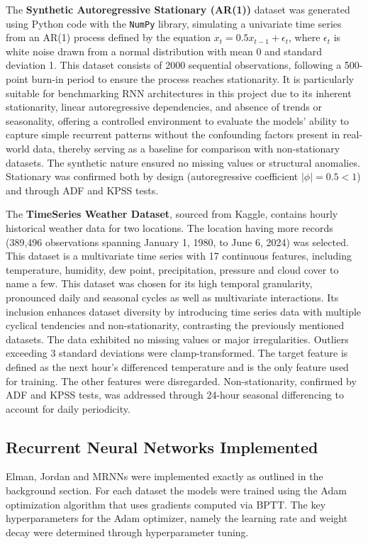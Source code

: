 \documentclass[conference, 10pt]{IEEEtran}
\begin{document}
The \textbf{Synthetic Autoregressive Stationary (AR(1))} dataset was generated using Python code with the \texttt{NumPy}
library, simulating a univariate time series from an AR(1) process defined by the equation $x_t = 0.5 x_{t-1} +
\epsilon_t$, where $\epsilon_t$ is white noise drawn from a normal distribution with mean 0 and standard deviation 1.
This dataset consists of 2000 sequential observations, following a 500-point burn-in period to ensure the process reaches
stationarity. It is particularly suitable for benchmarking RNN architectures in this project due to its inherent
stationarity, linear autoregressive dependencies, and absence of trends or seasonality, offering a controlled
environment to evaluate the models' ability to capture simple recurrent patterns without the confounding factors present
in real-world data, thereby serving as a baseline for comparison with non-stationary datasets. The synthetic nature
ensured no missing values or structural anomalies. Stationary was confirmed both by design (autoregressive coefficient
$|\phi| = 0.5 < 1$) and through ADF and KPSS tests.

The \textbf{TimeSeries Weather Dataset}, sourced from Kaggle, contains hourly historical weather data for two locations.
The location having more records (389,496 observations spanning January 1, 1980, to June 6, 2024) was selected. This
dataset is a multivariate time series with 17 continuous features, including temperature, humidity, dew point,
precipitation, pressure and cloud cover to name a few. This dataset was chosen for its high temporal granularity,
pronounced daily and seasonal cycles as well as multivariate interactions. Its inclusion enhances dataset diversity by
introducing time series data with multiple cyclical tendencies and non-stationarity, contrasting the previously
mentioned datasets. The data exhibited no missing values or major irregularities. Outliers exceeding 3 standard
deviations were clamp-transformed. The target feature is defined as the next hour's differenced temperature and is the
only feature used for training. The other features were disregarded. Non-stationarity, confirmed by ADF and KPSS tests,
was addressed through 24-hour seasonal differencing to account for daily periodicity.

\subsection{Recurrent Neural Networks Implemented}
Elman, Jordan and MRNNs were implemented exactly as outlined in the background section. For each dataset the
models were trained using the Adam optimization algorithm that uses gradients computed via BPTT. The key hyperparameters
for the Adam optimizer, namely the learning rate and weight decay were determined through hyperparameter tuning.
\end{document}
